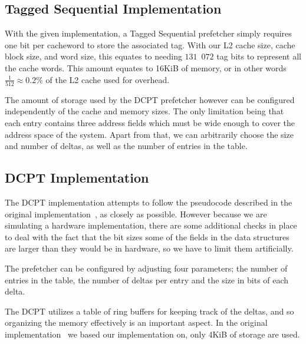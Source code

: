 \subsection{Tagged Sequential Implementation}


With the given implementation, a Tagged Sequential prefetcher simply requires
one bit per cacheword to store the associated tag. With our L2 cache size, cache block size, and word size, this equates to needing $131$~$072$ tag bits to
represent all the cache words. This amount equates to 16KiB of memory, or in
other words $\frac{1}{512} \approx 0.2\%$ of the L2 cache used for overhead.

The amount of storage used by the DCPT prefetcher however can be configured
independently of the cache and memory sizes. The only limitation being that each
entry contains three address fields which must be wide enough to cover the
address space of the system. Apart from that, we can arbitrarily choose the size
and number of deltas, as well as the number of entries in the table.

\subsection{DCPT Implementation}


The DCPT implementation attempts to follow the pseudocode described in the
original implementation~\cite{dcpt}, as closely as possible. However because we
are simulating a hardware implementation, there are some additional checks in
place to deal
with the fact that the bit sizes some of the fields in the data
structures are larger than they would be in hardware, so we have to limit them
artificially.

The prefetcher can be configured by adjusting four parameters; the number of entries
in the table, the number of deltas per entry and the size in bits of each delta.

The DCPT utilizes a table of ring buffers for keeping track of the deltas, and
so organizing the memory effectively is an important aspect. In the original
implementation~\cite{dcpt} we based our implementation on, only 4KiB of storage
are used.

